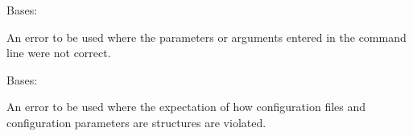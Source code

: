\documentclass[letterpaper,11pt,english]{sphinxmanual}
\begin{document}

\begin{savenotes}\begin{fulllineitems}
\label{\detokenize{code/opihiexarata.library.error:opihiexarata.library.error.CommandLineError}}
\pysigstartsignatures
{}
\pysigstopsignatures
\sphinxAtStartPar
Bases: {\hyperref[\detokenize{code/opihiexarata.library.error:opihiexarata.library.error.ExarataException}]{}}

\sphinxAtStartPar
An error to be used where the parameters or arguments entered in the
command line were not correct.

\end{fulllineitems}\end{savenotes}


\begin{savenotes}\begin{fulllineitems}
\label{\detokenize{code/opihiexarata.library.error:opihiexarata.library.error.ConfigurationError}}
\pysigstartsignatures
{}
\pysigstopsignatures
\sphinxAtStartPar
Bases: {\hyperref[\detokenize{code/opihiexarata.library.error:opihiexarata.library.error.ExarataException}]{}}

\sphinxAtStartPar
An error to be used where the expectation of how configuration files
and configuration parameters are structures are violated.

\end{fulllineitems}\end{savenotes}

\end{document}
